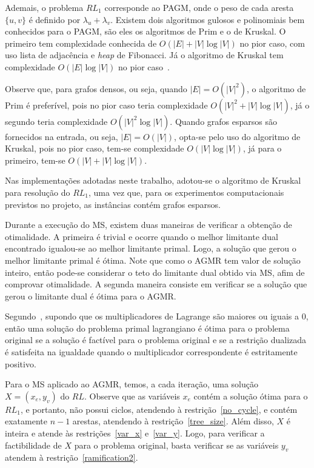 \documentclass[12pt, a4paper]{article}
\theoremstyle{plain}
\theoremstyle{definition}
\theoremstyle{remark}
\begin{document}
Ademais, o problema $RL_1$ corresponde ao PAGM, onde o peso de cada aresta $\{u, v\}$ é definido por $\lambda_u + \lambda_v$. Existem dois algoritmos gulosos e polinomiais bem conhecidos para o PAGM, são eles os algoritmos de Prim e o de Kruskal. O primeiro tem complexidade conhecida de $O(|E| + |V|\log|V|)$ no pior caso, com uso lista de adjacência e \textit{heap} de Fibonacci. Já o algoritmo de Kruskal tem complexidade $O(|E|\log|V|)$ no pior caso~\cite{Cormen2009}.

Observe que, para grafos densos, ou seja, quando $|E| = O(|V|^2)$, o algoritmo de Prim é preferível, pois no pior caso teria complexidade $O(|V|^2 + |V|\log|V|)$, já o segundo teria complexidade $O(|V|^2\log|V|)$. Quando grafos esparsos são fornecidos na entrada, ou seja, $|E| = O(|V|)$, opta-se pelo uso do algoritmo de Kruskal, pois no pior caso, tem-se complexidade $O(|V|\log|V|)$, já para o primeiro, tem-se $O(|V| + |V|\log|V|)$.

Nas implementações adotadas neste trabalho, adotou-se o algoritmo de Kruskal para resolução do $RL_1$, uma vez que, para os experimentos computacionais previstos no projeto, as instâncias contém grafos esparsos. 

Durante a execução do MS, existem duas maneiras de verificar a obtenção de otimalidade. A primeira é trivial e ocorre quando o melhor limitante dual encontrado igualou-se ao melhor limitante primal. Logo, a solução que gerou o melhor limitante primal é ótima. Note que como o AGMR tem valor de solução inteiro, então pode-se considerar o teto do limitante dual obtido via MS, afim de comprovar otimalidade. A segunda maneira consiste em verificar se a solução que gerou o limitante dual é ótima para o AGMR.

Segundo~\cite{Beasley1993}, supondo que os multiplicadores de Lagrange são maiores ou iguais a $0$, então uma solução do problema primal lagrangiano é ótima para o problema original se a solução é factível para o problema original e se a restrição dualizada é satisfeita na igualdade quando o multiplicador correspondente é estritamente positivo.

Para o MS aplicado ao AGMR, temos, a cada iteração, uma solução $X = (x_e, y_v)$ do $RL$. Observe que as variáveis $x_e$ contém a solução ótima para o $RL_1$, e portanto, não possui ciclos, atendendo à restrição~\eqref{no_cycle}, e contém exatamente $n - 1$ arestas, atendendo à restrição~\eqref{tree_size}. Além disso, $X$ é inteira e atende às restrições~\eqref{var_x} e~\eqref{var_y}. Logo, para verificar a factibilidade de $X$ para o problema original, basta verificar se as variáveis $y_v$ atendem à restrição~\eqref{ramification2}.
\end{document}
